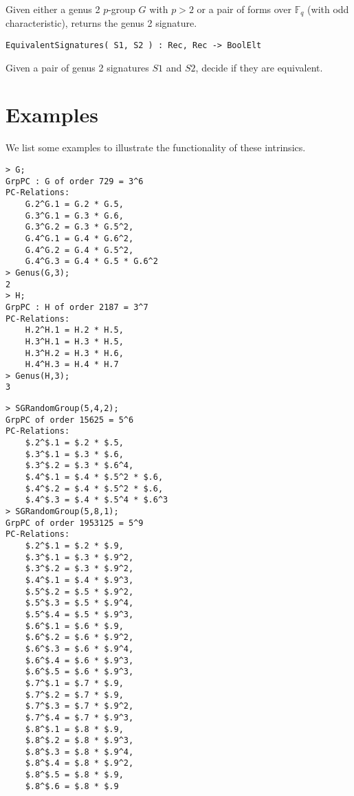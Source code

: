 \documentclass{documentation}
\begin{document}
\color{black}
Given either a genus 2 $p$-group $G$ with $p>2$ or a pair of forms over $\mathbb{F}_q$ (with odd characteristic), returns the genus 2 signature.

\color{blue}
\begin{verbatim}
EquivalentSignatures( S1, S2 ) : Rec, Rec -> BoolElt
\end{verbatim}

\color{black}
Given a pair of genus 2 signatures $S1$ and $S2$, decide if they are equivalent.

\section{Examples}
We list some examples to illustrate the functionality of these intrinsics.

\begin{lstlisting}[frame=single,basicstyle=\ttfamily\color{black!30!teal},backgroundcolor=\color{white!70!gray}]
> G;
GrpPC : G of order 729 = 3^6
PC-Relations:
    G.2^G.1 = G.2 * G.5, 
    G.3^G.1 = G.3 * G.6, 
    G.3^G.2 = G.3 * G.5^2, 
    G.4^G.1 = G.4 * G.6^2, 
    G.4^G.2 = G.4 * G.5^2, 
    G.4^G.3 = G.4 * G.5 * G.6^2
> Genus(G,3);
2
> H;
GrpPC : H of order 2187 = 3^7
PC-Relations:
    H.2^H.1 = H.2 * H.5, 
    H.3^H.1 = H.3 * H.5, 
    H.3^H.2 = H.3 * H.6, 
    H.4^H.3 = H.4 * H.7
> Genus(H,3);
3
\end{lstlisting}

\begin{lstlisting}[frame=single,basicstyle=\ttfamily\color{black!30!teal},backgroundcolor=\color{white!70!gray}]
> SGRandomGroup(5,4,2);                        
GrpPC of order 15625 = 5^6
PC-Relations:
    $.2^$.1 = $.2 * $.5, 
    $.3^$.1 = $.3 * $.6, 
    $.3^$.2 = $.3 * $.6^4, 
    $.4^$.1 = $.4 * $.5^2 * $.6, 
    $.4^$.2 = $.4 * $.5^2 * $.6, 
    $.4^$.3 = $.4 * $.5^4 * $.6^3
> SGRandomGroup(5,8,1);
GrpPC of order 1953125 = 5^9
PC-Relations:
    $.2^$.1 = $.2 * $.9, 
    $.3^$.1 = $.3 * $.9^2, 
    $.3^$.2 = $.3 * $.9^2, 
    $.4^$.1 = $.4 * $.9^3, 
    $.5^$.2 = $.5 * $.9^2, 
    $.5^$.3 = $.5 * $.9^4, 
    $.5^$.4 = $.5 * $.9^3, 
    $.6^$.1 = $.6 * $.9, 
    $.6^$.2 = $.6 * $.9^2, 
    $.6^$.3 = $.6 * $.9^4, 
    $.6^$.4 = $.6 * $.9^3, 
    $.6^$.5 = $.6 * $.9^3, 
    $.7^$.1 = $.7 * $.9, 
    $.7^$.2 = $.7 * $.9, 
    $.7^$.3 = $.7 * $.9^2, 
    $.7^$.4 = $.7 * $.9^3, 
    $.8^$.1 = $.8 * $.9, 
    $.8^$.2 = $.8 * $.9^3, 
    $.8^$.3 = $.8 * $.9^4, 
    $.8^$.4 = $.8 * $.9^2, 
    $.8^$.5 = $.8 * $.9, 
    $.8^$.6 = $.8 * $.9
\end{lstlisting}
\end{document}
